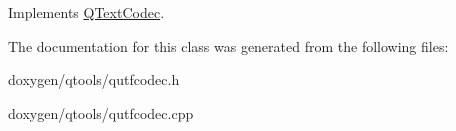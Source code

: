 Implements \mbox{\hyperlink{class_q_text_codec_a5b735ce19dc6b0fb0e8858bd3f54f0e2}{Q\+Text\+Codec}}.



The documentation for this class was generated from the following files\+:\begin{DoxyCompactItemize}
\item 
doxygen/qtools/qutfcodec.\+h\item 
doxygen/qtools/qutfcodec.\+cpp\end{DoxyCompactItemize}
